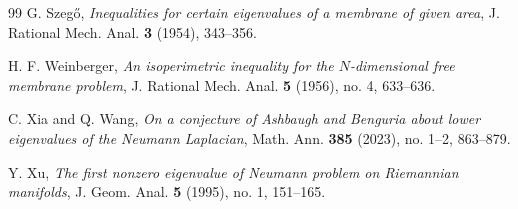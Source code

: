 \documentclass[11pt]{amsart}
\theoremstyle{remark}
\begin{document}
\begin{thebibliography}{99}
G. Szeg\H{o},
\emph{Inequalities for certain eigenvalues of a membrane of given area},
J. Rational Mech. Anal. \textbf{3} (1954), 343--356.

H. F. Weinberger,
\emph{An isoperimetric inequality for the $N$-dimensional free membrane problem},
J. Rational Mech. Anal. \textbf{5} (1956), no. 4, 633--636.

C. Xia and Q. Wang,
\emph{On a conjecture of Ashbaugh and Benguria about lower eigenvalues of the Neumann Laplacian},
Math. Ann. \textbf{385} (2023), no. 1--2, 863--879.

Y. Xu,
\emph{The first nonzero eigenvalue of Neumann problem on Riemannian manifolds},
J. Geom. Anal. \textbf{5} (1995), no. 1, 151--165.

\end{thebibliography}
\end{document}
